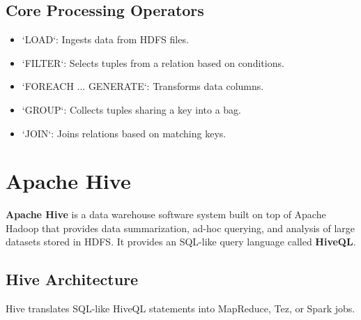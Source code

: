 \documentclass[12pt,a4paper]{article}
\begin{document}
\subsection{Core Processing Operators}
\begin{itemize}[leftmargin=*, itemsep=3pt]
  \item `LOAD`: Ingests data from HDFS files.
  \item `FILTER`: Selects tuples from a relation based on conditions.
  \item `FOREACH ... GENERATE`: Transforms data columns.
  \item `GROUP`: Collects tuples sharing a key into a bag.
  \item `JOIN`: Joins relations based on matching keys.
\end{itemize}

\section{Apache Hive}

\begin{tcolorbox}[defbox, title={Apache Hive}]
  \textbf{Apache Hive} is a data warehouse software system built on top of Apache Hadoop that provides data summarization, ad-hoc querying, and analysis of large datasets stored in HDFS. It provides an SQL-like query language called \textbf{HiveQL}.
\end{tcolorbox}

\subsection{Hive Architecture}
Hive translates SQL-like HiveQL statements into MapReduce, Tez, or Spark jobs.
\end{document}
